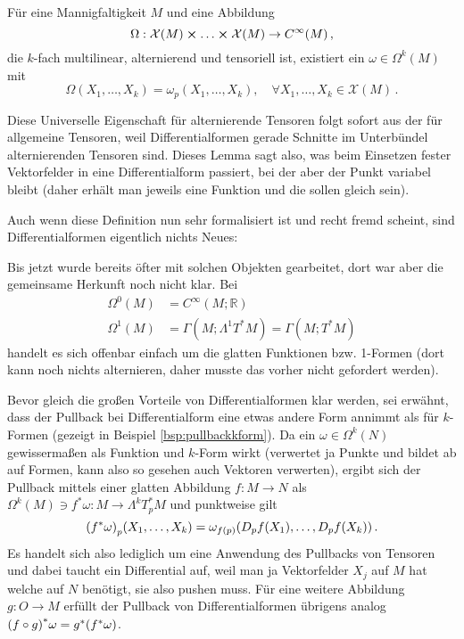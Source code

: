 \documentclass[../H_Analysis_main.tex]{subfiles}
\begin{document}
\begin{lemma}
Für eine Mannigfaltigkeit $M$ und eine Abbildung
\begin{equation*}
\Omega: \mathcal{X}(M) \cross \dots \cross \mathcal{X}(M) \rightarrow C^\infty(M) \, ,
\end{equation*}
die $k$-fach multilinear, alternierend und tensoriell ist, existiert ein $\omega \in \Omega^k(M)$ mit
\begin{equation}
\Omega(X_1, \dots, X_k) = \omega_p(X_1, \dots, X_k), \quad \forall X_1, \dots, X_k \in \mathcal{X}(M) \, .
\end{equation}
\end{lemma}
Diese Universelle Eigenschaft für alternierende Tensoren folgt sofort aus der für allgemeine Tensoren, weil Differentialformen gerade Schnitte im Unterbündel alternierenden Tensoren sind. Dieses Lemma sagt also, was beim Einsetzen fester Vektorfelder in eine Differentialform passiert, bei der aber der Punkt variabel bleibt (daher erhält man jeweils eine Funktion und die sollen gleich sein).


Auch wenn diese Definition nun sehr formalisiert ist und recht fremd scheint, sind Differentialformen eigentlich nichts Neues:
\begin{bsp}
Bis jetzt wurde bereits öfter mit solchen Objekten gearbeitet, dort war aber die gemeinsame Herkunft noch nicht klar. Bei
\begin{align}
\Omega^0(M) &= C^\infty(M; \mathbb{R})
\\
\Omega^1(M) &= \Gamma(M; \Lambda^1 T^*M) = \Gamma(M; T^*M)
\end{align}
handelt es sich offenbar einfach um die glatten Funktionen bzw. 1-Formen (dort kann noch nichts alternieren, daher musste das vorher nicht gefordert werden).
\end{bsp}


Bevor gleich die großen Vorteile von Differentialformen klar werden, sei erwähnt, dass der Pullback bei Differentialform eine etwas andere Form annimmt als für $k$-Formen (gezeigt in Beispiel \ref{bsp:pullbackkform}). Da ein $\omega \in \Omega^k(N)$ gewissermaßen als Funktion und $k$-Form wirkt (verwertet ja Punkte und bildet ab auf Formen, kann also so gesehen auch Vektoren verwerten), ergibt sich der Pullback mittels einer glatten Abbildung $f: M \rightarrow N$ als $\Omega^k(M) \ni f^* \omega: M \rightarrow \Lambda^k T_p^* M$ und punktweise gilt
\begin{equation}
\qty(f^* \omega)_p (X_1, \dots, X_k) = \omega_{f(p)} \qty(D_p f(X_1), \dots, D_p f(X_k)) \, .%
\end{equation}
Es handelt sich also lediglich um eine Anwendung des Pullbacks von Tensoren und dabei taucht ein Differential auf, weil man ja Vektorfelder $X_j$ auf $M$ hat welche auf $N$ benötigt, sie also pushen muss. Für eine weitere Abbildung $g: O \rightarrow M$ erfüllt der Pullback von Differentialformen übrigens analog $\qty(f \circ g)^* \omega = g^*\qty(f^* \omega)$.
\end{document}
